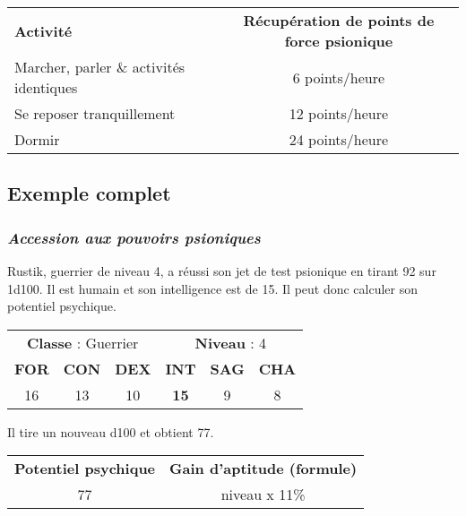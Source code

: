 \bigskip

\begin{tabular}{lp{0.3cm}c}
\textbf{Activité}                       && \textbf{Récupération de points de force psionique} \\
Marcher, parler \& activités identiques && 6 points/heure \\
Se reposer tranquillement               && 12 points/heure \\
Dormir                                  && 24 points/heure \\
\end{tabular}

\newpage
\subsection*{Exemple complet}
\label{exemple-complet}

\subsubsection*{\textit{Accession aux pouvoirs psioniques}}

Rustik, guerrier de niveau 4, a réussi son jet de test psionique en tirant 92 sur 1d100. Il est humain et son intelligence est de 15. Il peut donc calculer son potentiel psychique.

\bigskip

\begin{tabular}{cccccc}
\multicolumn{3}{c}{\textbf{Classe} : Guerrier} & \multicolumn{3}{c}{\textbf{Niveau} : 4} \\
\textbf{FOR} & \textbf{CON} & \textbf{DEX} & \textbf{INT} & \textbf{SAG} & \textbf{CHA} \\
16 & 13 & 10 & \textbf{15} & 9 & 8 \\
\end{tabular}

\bigskip

Il tire un nouveau d100 et obtient 77.

\bigskip

\begin{tabular}{cc}
\textbf{Potentiel psychique} & \textbf{Gain d'aptitude (formule)}\\
77 & niveau x 11\% \\
\end{tabular}

